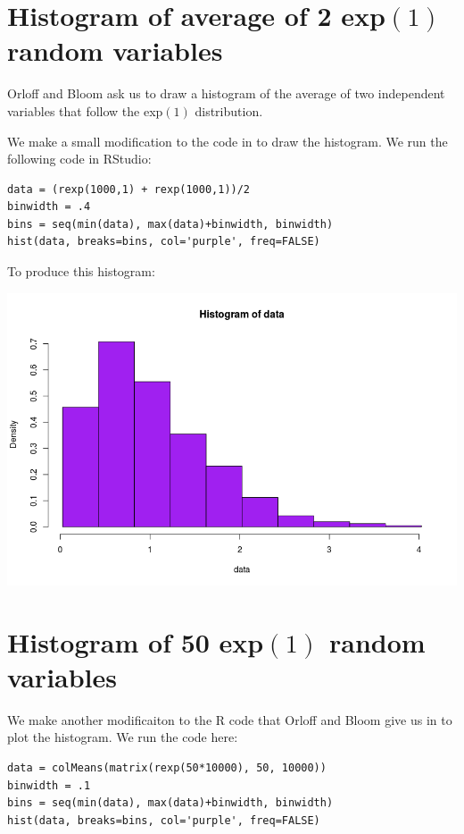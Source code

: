 \documentclass[a4paper,11pt]{article}
\begin{document}
\section{Histogram of average of 2 exp$\left(1 \right)$ random variables}

Orloff and Bloom ask us to draw a histogram of the average of two independent
variables that follow the exp$\left( 1 \right)$ distribution.

We make a small modification to the code in \cite{studio3r} to draw the
histogram.  We run the following code in RStudio:

\begin{lstlisting}
data = (rexp(1000,1) + rexp(1000,1))/2
binwidth = .4
bins = seq(min(data), max(data)+binwidth, binwidth)
hist(data, breaks=bins, col='purple', freq=FALSE)
\end{lstlisting}

To produce this histogram:

\includegraphics[scale=0.5]{hist-2-exp-1}

\section{Histogram of 50 exp$\left(1 \right)$ random variables}

We make another modificaiton to the R code that Orloff and Bloom give us in
\cite{studio3r} to plot the histogram.  We run the code here:
\begin{lstlisting}
data = colMeans(matrix(rexp(50*10000), 50, 10000))
binwidth = .1
bins = seq(min(data), max(data)+binwidth, binwidth)
hist(data, breaks=bins, col='purple', freq=FALSE)
\end{lstlisting}
\end{document}
